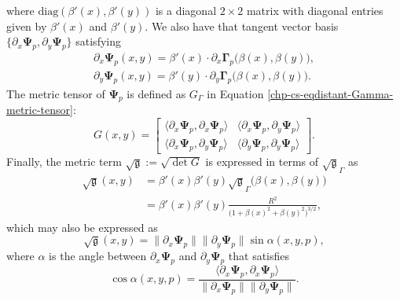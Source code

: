 where $\text{diag}(\beta'(x),\beta'(y))$ is a diagonal $2\times 2$ matrix with diagonal entries given by $\beta'(x)$ and $\beta'(y)$.
We also have that tangent vector basis $\{{\partial_x  \boldsymbol{\Psi}_p},  {\partial_y  \boldsymbol{\Psi}_p}\}$ satisfying
\begin{align*}
	{\partial_x  \boldsymbol{\Psi}_p}(x,y) = \beta'(x) \cdot {\partial_x  \boldsymbol{\Gamma}_p}\big(\beta(x),\beta(y)\big),\\
	{\partial_y  \boldsymbol{\Psi}_p}(x,y) = \beta'(y) \cdot {\partial_y  \boldsymbol{\Gamma}_p}\big(\beta(x),\beta(y)\big).
\end{align*}
The metric tensor of $\boldsymbol{\Psi}_p$ is defined as $G_{\Gamma}$ in Equation \eqref{chp-cs-eqdistant-Gamma-metric-tensor}:
\begin{equation*}
	\label{chp-cs-eqdistant-Psi-metric-tensor}
	G(x,y) = 
	\begin{bmatrix}
		\langle  {\partial_x  \boldsymbol{\Psi}_p}, {\partial_x \boldsymbol{\Psi}_p} \rangle & 
		\langle  {\partial_x  \boldsymbol{\Psi}_p}, {\partial_y \boldsymbol{\Psi}_p} \rangle \\
		\langle  {\partial_x  \boldsymbol{\Psi}_p}, {\partial_y \boldsymbol{\Psi}_p} \rangle  &
		\langle  {\partial_y  \boldsymbol{\Psi}_p}, {\partial_y \boldsymbol{\Psi}_p} \rangle 
	\end{bmatrix}.
\end{equation*}
Finally, the metric term $\sqrt{\mathfrak{g}}:= \sqrt{\det{G}}$ is expressed in terms of $\sqrt{\mathfrak{g}}_{\Gamma}$ as
\begin{align*}
    \sqrt{\mathfrak{g}}(x,y) &= \beta'(x)\beta'(y)\sqrt{\mathfrak{g}}_{\Gamma}\big(\beta(x),\beta(y)\big)\\
    &= \beta'(x)\beta'(y)\frac{R^2}{\big(1+\beta(x)^2+\beta(y)^2\big)^{3/2}},
\end{align*}
which may also be expressed as
\begin{equation}
	\label{mt-sina}
	\sqrt{\mathfrak{g}}(x,y) =	
\|\partial_x  \boldsymbol{\Psi}_p \| \|\partial_y  \boldsymbol{\Psi}_p \| \sin \alpha(x,y,p),
\end{equation}
where $\alpha$ is the angle between $\partial_x \boldsymbol{\Psi}_p$ and $\partial_y \boldsymbol{\Psi}_p$ that
satisfies
\begin{equation*}
	\label{mt-cosa}
\cos{\alpha(x,y,p)} = \frac{\langle  {\partial_x  \boldsymbol{\Psi}_p}, {\partial_x \boldsymbol{\Psi}_p} \rangle }
{\|\partial_x \boldsymbol{\Psi}_p\|  \|\partial_y \boldsymbol{\Psi}_p\|}.
\end{equation*}

